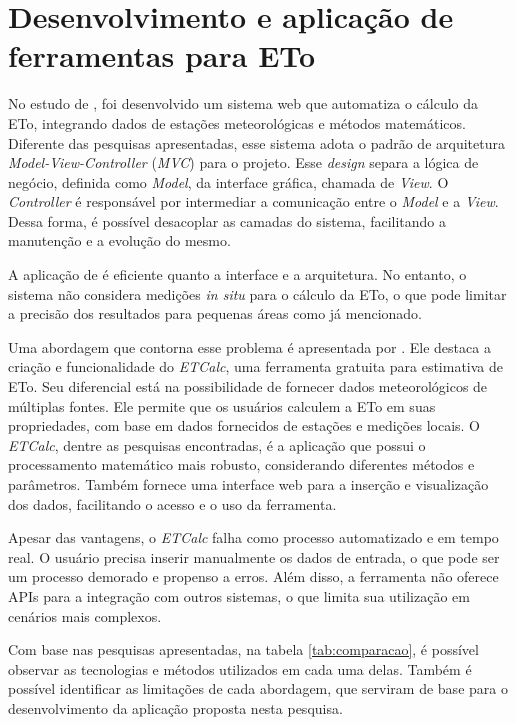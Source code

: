 \section{Desenvolvimento e aplicação de ferramentas para ETo}
No estudo de \textcite{Taison_webeva2019}, foi desenvolvido um sistema web que automatiza o cálculo da ETo, integrando dados de estações meteorológicas e métodos matemáticos. Diferente das pesquisas apresentadas, esse sistema adota o padrão de arquitetura \textit{Model-View-Controller} (\textit{MVC}) para o projeto. Esse \textit{design} separa a lógica de negócio, definida como \textit{Model}, da interface gráfica, chamada de \textit{View}. O \textit{Controller} é responsável por intermediar a comunicação entre o \textit{Model} e a \textit{View}. Dessa forma, é possível desacoplar as camadas do sistema, facilitando a manutenção e a evolução do mesmo.

A aplicação de \textcite{Taison_webeva2019} é eficiente quanto a interface e a arquitetura. No entanto, o sistema não considera medições \textit{in situ} para o cálculo da ETo, o que pode limitar a precisão dos resultados para pequenas áreas como já mencionado. 

Uma abordagem que contorna esse problema é apresentada por \textcite{Serban_webeva2022}. Ele destaca a criação e funcionalidade do \textit{ETCalc}, uma ferramenta gratuita para estimativa de ETo. Seu diferencial está na possibilidade de fornecer dados meteorológicos de múltiplas fontes. Ele permite que os usuários calculem a ETo em suas propriedades, com base em dados fornecidos de estações e medições locais. O \textit{ETCalc}, dentre as pesquisas encontradas, é a aplicação que possui o processamento matemático mais robusto, considerando diferentes métodos e parâmetros. Também fornece uma interface web para a inserção e visualização dos dados, facilitando o acesso e o uso da ferramenta.

Apesar das vantagens, o \textit{ETCalc} falha como processo automatizado e em tempo real. O usuário precisa inserir manualmente os dados de entrada, o que pode ser um processo demorado e propenso a erros. Além disso, a ferramenta não oferece APIs para a integração com outros sistemas, o que limita sua utilização em cenários mais complexos.

Com base nas pesquisas apresentadas, na tabela \ref{tab:comparacao}, é possível observar as tecnologias e métodos utilizados em cada uma delas. Também é possível identificar as limitações de cada abordagem, que serviram de base para o desenvolvimento da aplicação proposta nesta pesquisa.

